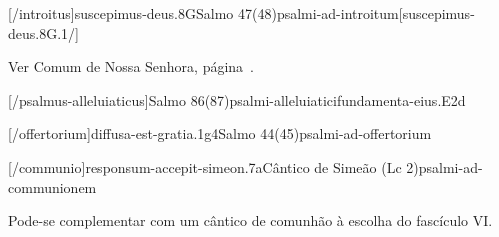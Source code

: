 \AllowPageFlush

[\Prefix/introitus]{suscepimus-deus.8G}{Salmo 47(48)}{psalmi-ad-introitum}[suscepimus-deus.8G.1/]


\begin{rubrica}
  Ver Comum de Nossa Senhora, página~\pageref{subsection:communia/commune-bmv/psalmus-responsorius}.
\end{rubrica}


\AllowPageFlush

[\Prefix/psalmus-alleluiaticus]{Salmo 86(87)}{psalmi-alleluiatici}{fundamenta-eius.E2d}

\AllowPageFlush

[\Prefix/offertorium]{diffusa-est-gratia.1g4}{Salmo 44(45)}{psalmi-ad-offertorium}

\AllowPageFlush

[\Prefix/communio]{responsum-accepit-simeon.7a}{Cântico de Simeão (Lc 2)}{psalmi-ad-communionem}

\begin{rubrica}
  Pode-se complementar com um cântico de comunhão à escolha do fascículo VI.
\end{rubrica}

\AllowPageBreak